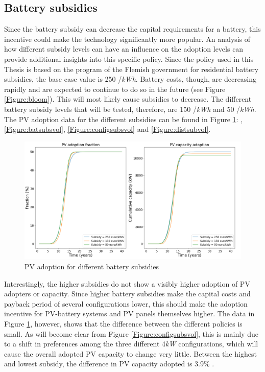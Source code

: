 \subsection{Battery subsidies}
Since the battery subsidy can decrease the capital requirements for a battery, this incentive could make the technology significantly more popular. An analysis of how different subsidy levels can have an influence on the adoption levels can provide additional insights into this specific policy. Since the policy used in this Thesis is based on the program of the Flemish government for residential battery subsidies, the base case value is 250 \EUR{}/\textit{kWh}. Battery costs, though, are decreasing rapidly and are expected to continue to do so in the future (see Figure \ref{Figure:bloom}). This will most likely cause subsidies to decrease. The different battery subsidy levels that will be tested, therefore, are 150 \EUR{}/\textit{kWh} and 50 \EUR{}/\textit{kWh}.
The PV adoption data for the different subsidies can be found in Figure \ref{Figure:PVsubsvol}:
, \ref{Figure:batsubsvol}, \ref{Figure:configsubsvol} and \ref{Figure:distsubvol}. 
\begin{figure}[h!]
\centering
\includegraphics[width=12cm]{ModelAnalysis/PVsubs.png}
\caption{PV adoption for different battery subsidies}
\label{Figure:PVsubsvol}
\end{figure}
 \noindent 
Interestingly, the higher subsidies do not show a visibly higher adoption of PV adopters or capacity. Since higher battery subsidies make the capital costs and payback period of several configurations lower, this should make the adoption incentive for PV-battery systems and PV panels themselves higher. The data in Figure \ref{Figure:PVsubsvol},  however, shows that the difference between the different policies is small. As will become clear from Figure \ref{Figure:configsubsvol}, this is mainly due to a shift in preferences among the three different 4\textit{kW} configurations, which will cause the overall adopted PV capacity to change very little. Between the highest and lowest subsidy, the difference in PV capacity adopted is 3.9\% . 
